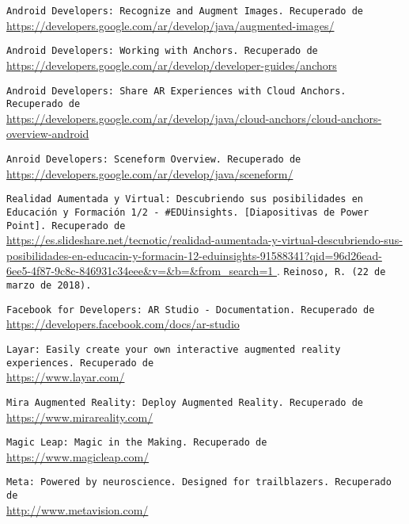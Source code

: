 {\tt Android Developers: Recognize and Augment Images. Recuperado de }\\
\url{https://developers.google.com/ar/develop/java/augmented-images/}

{\tt Android Developers: Working with Anchors. Recuperado de }\\
\url{https://developers.google.com/ar/develop/developer-guides/anchors}

{\tt Android Developers: Share AR Experiences with Cloud Anchors. Recuperado de }\\
\url{https://developers.google.com/ar/develop/java/cloud-anchors/cloud-anchors-overview-android}

{\tt Anroid Developers: Sceneform Overview. Recuperado de }\\
\url{https://developers.google.com/ar/develop/java/sceneform/}

{\tt Realidad Aumentada y Virtual: Descubriendo sus posibilidades en Educación y Formación 1/2 - #EDUinsights. [Diapositivas de Power Point]. Recuperado de }\\
\url{https://es.slideshare.net/tecnotic/realidad-aumentada-y-virtual-descubriendo-sus-posibilidades-en-educacin-y-formacin-12-eduinsights-91588341?qid=96d26ead-6ee5-4f87-9c8c-846931c34eee&v=&b=&from_search=1  } . {\tt Reinoso, R. (22 de marzo de 2018).}

{\tt Facebook for Developers: AR Studio - Documentation. Recuperado de }\\
\url{https://developers.facebook.com/docs/ar-studio}

{\tt Layar: Easily create your own interactive augmented reality experiences. Recuperado de }\\
\url{https://www.layar.com/}

{\tt Mira Augmented Reality: Deploy Augmented Reality. Recuperado de }\\
\url{https://www.mirareality.com/}

{\tt Magic Leap: Magic in the Making. Recuperado de }\\
\url{https://www.magicleap.com/}

{\tt Meta: Powered by neuroscience. Designed for trailblazers. Recuperado de }\\
\url{http://www.metavision.com/}

